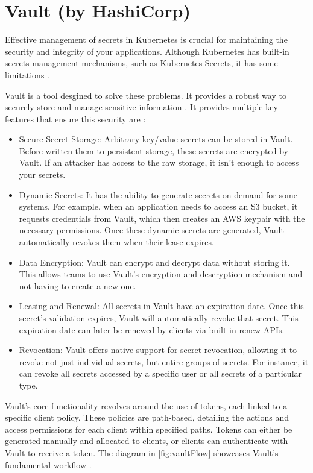\documentclass[a4paper,11pt,openright,BCOR=15mm]{scrbook}
\begin{document}
\section{Vault (by HashiCorp)}\label{sect:complementSecrets}

Effective management of secrets in Kubernetes is crucial for maintaining the security and integrity of your applications. Although Kubernetes has built-in secrets management mechanisms, such as Kubernetes Secrets, it has some limitations \cite{muppeda_guide_vault_2024}.

Vault is a tool desgined to solve these problems. It provides a robust way to securely store and manage sensitive information \cite{muppeda_guide_vault_2024}. It provides multiple key features that ensure this security are \cite{vault_doc_introduction_nodate}:

\begin{itemize}
	\item Secure Secret Storage: Arbitrary key/value secrets can be stored in Vault. Before written them to persistent storage, these secrets are encrypted by Vault. If an attacker has access to the raw storage, it isn't enough to access your secrets.
	\item Dynamic Secrets: It has the ability to generate secrets on-demand for some systems. For example, when an application needs to access an S3 bucket, it requests credentials from Vault, which then creates an AWS keypair with the necessary permissions. Once these dynamic secrets are generated, Vault automatically revokes them when their lease expires.
	\item Data Encryption: Vault can encrypt and decrypt data without storing it. This allows teams to use Vault's encryption and descryption mechanism and not having to create a new one.
	\item Leasing and Renewal: All secrets in Vault have an expiration date. Once this secret's validation expires, Vault will automatically revoke that secret. This expiration date can later be renewed by clients via built-in renew APIs.
	\item Revocation: Vault offers native support for secret revocation, allowing it to revoke not just individual secrets, but entire groups of secrets. For instance, it can revoke all secrets accessed by a specific user or all secrets of a particular type.
\end{itemize}

Vault's core functionality revolves around the use of tokens, each linked to a specific client policy. These policies are path-based, detailing the actions and access permissions for each client within specified paths. Tokens can either be generated manually and allocated to clients, or clients can authenticate with Vault to receive a token. The diagram in \ref{fig:vaultFlow} showcases Vault's fundamental workflow \cite{vault_doc_introduction_nodate}.
\end{document}
